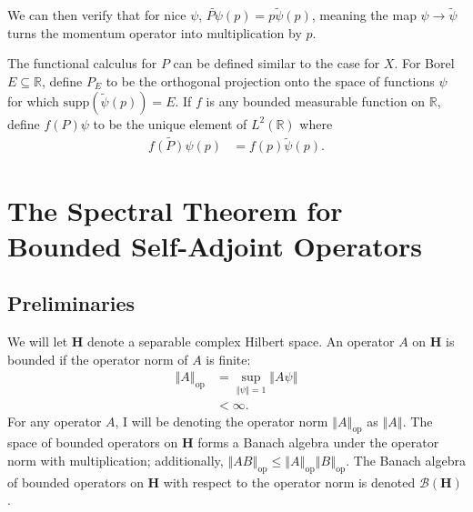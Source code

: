 \documentclass[12pt]{extarticle}
\newcommand{\R}{\mathbb{R}}
\newcommand{\norm}[1]{\left\Vert #1\right\Vert}
\theoremstyle{plain}
\theoremstyle{definition}
\theoremstyle{remark}
\renewcommand{\newline}{\hfill\break}
\begin{document}
  We can then verify that for nice $\psi$, $\widetilde{P\psi}(p) = p\tilde{\psi}(p)$, meaning the map $\psi \rightarrow \tilde{\psi}$ turns the momentum operator into multiplication by $p$.\newline

  The functional calculus for $P$ can be defined similar to the case for $X$. For Borel $E\subseteq \R$, define $P_E$ to be the orthogonal projection onto the space of functions $\psi$ for which $\text{supp}(\tilde{\psi}(p)) = E$. If $f$ is any bounded measurable function on $\R$, define $f(P)\psi$ to be the unique element of $L^{2}(\R)$ where
  \begin{align*}
    \widetilde{f(P)\psi}(p) &= f(p)\tilde{\psi}(p).
  \end{align*}
  \section{The Spectral Theorem for Bounded Self-Adjoint Operators}%
  \subsection{Preliminaries}%
  We will let $\mathbf{H}$ denote a separable complex Hilbert space. An operator $A$ on $\mathbf{H}$ is bounded if the operator norm of $A$ is finite:
  \begin{align*}
    \norm{A}_{\text{op}} &= \sup_{\norm{\psi} = 1}\norm{A\psi}\\
                         &< \infty.
  \end{align*}
  For any operator $A$, I will be denoting the operator norm $\norm{A}_{\text{op}} $ as $ \norm{A}$. The space of bounded operators on $\mathbf{H}$ forms a Banach algebra under the operator norm with multiplication; additionally, $\norm{AB}_{\text{op}}\leq \norm{A}_{\text{op}}\norm{B}_{\text{op}}$. The Banach algebra of bounded operators on $\mathbf{H}$ with respect to the operator norm is denoted $\mathcal{B}(\mathbf{H})$.\newline
\end{document}
